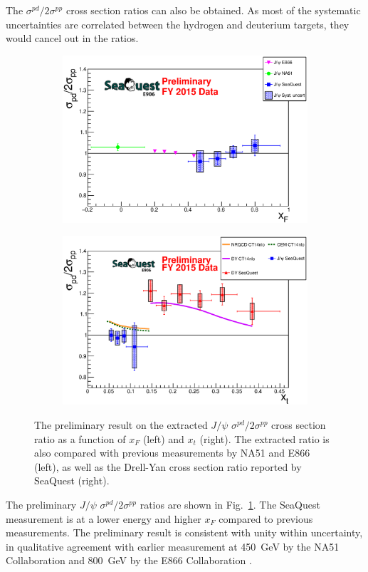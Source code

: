 \documentclass[10pt,a4paper,final]{article}
\begin{document}
The $\sigma^{pd}/2\sigma^{pp}$ cross section ratios can also be obtained. As most of the
systematic uncertainties are correlated between the hydrogen and deuterium targets,
they would cancel out in the ratios.
\begin{figure}[htbp!]
	\centering
	\begin{subfigure}{0.45\linewidth}
		\includegraphics[width=0.9\linewidth]{jPsi_all_noTheory_v2}
	\end{subfigure}
	\begin{subfigure}{0.45\linewidth}
		\includegraphics[width=0.9\linewidth]{jPsi_csr_x2_nature_NRQCD_CEM}
	\end{subfigure}
	\caption{The preliminary result on the extracted $J/\psi$ $\sigma^{pd}/2\sigma^{pp}$
		cross section ratio as a function of $x_F$ (left) and $x_t$ (right).
		The extracted ratio is also compared with previous measurements by NA51
		and E866 (left), as well as the Drell-Yan cross section ratio reported
		by SeaQuest\cite{dove2021} (right).}
	\label{fig:csr}
\end{figure}
The preliminary $J/\psi$ $\sigma^{pd}/2\sigma^{pp}$ ratios are shown in
Fig.~\ref{fig:csr}. The SeaQuest measurement is at a lower energy and higher $x_F$
compared to previous measurements. The preliminary result is consistent with unity
within uncertainty, in qualitative agreement with earlier measurement at \SI{450}{\GeV}
by the NA51 Collaboration \cite{abreu1998} and \SI{800}{\GeV} by the E866 Collaboration
\cite{peng2003}.
\end{document}
